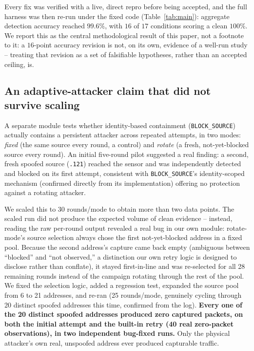 \documentclass[conference]{IEEEtran}
\begin{document}
Every fix was verified with a live, direct repro before being accepted, and the full harness was
then re-run under the fixed code (Table~\ref{tab:main}): aggregate detection accuracy reached
$99.6\%$, with $16$ of $17$ conditions scoring a clean $100\%$. We report this as the central
methodological result of this paper, not a footnote to it: a $16$-point accuracy revision is not,
on its own, evidence of a well-run study -- treating that revision as a set of falsifiable
hypotheses, rather than an accepted ceiling, is.

\subsection{An adaptive-attacker claim that did not survive scaling}
\label{sec:adaptivecorrection}

A separate module tests whether identity-based containment (\texttt{BLOCK\_SOURCE}) actually
contains a persistent attacker across repeated attempts, in two modes: \emph{fixed} (the same
source every round, a control) and \emph{rotate} (a fresh, not-yet-blocked source every round). An
initial five-round pilot suggested a real finding: a second, fresh spoofed source (\texttt{.121})
reached the sensor and was independently detected and blocked on its first attempt, consistent
with \texttt{BLOCK\_SOURCE}'s identity-scoped mechanism (confirmed directly from its
implementation) offering no protection against a rotating attacker.

We scaled this to 30 rounds/mode to obtain more than two data points. The scaled run did not
produce the expected volume of clean evidence -- instead, reading the raw per-round output
revealed a real bug in our own module: rotate-mode's source selection always chose the first
not-yet-blocked address in a fixed pool. Because the second address's capture came back empty
(ambiguous between ``blocked'' and ``not observed,'' a distinction our own retry logic is designed
to disclose rather than conflate), it stayed first-in-line and was re-selected for all 28 remaining
rounds instead of the campaign rotating through the rest of the pool. We fixed the selection logic,
added a regression test, expanded the source pool from 6 to 21 addresses, and re-ran (25
rounds/mode, genuinely cycling through 20 distinct spoofed addresses this time, confirmed from the
log). \textbf{Every one of the 20 distinct spoofed addresses produced zero captured packets, on
both the initial attempt and the built-in retry (40 real zero-packet observations), in two
independent bug-fixed runs.} Only the physical attacker's own real, unspoofed address ever
produced capturable traffic.
\end{document}
